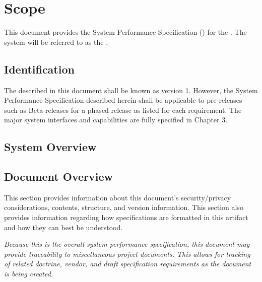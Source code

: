 
\chapter{Scope}
\label{loc:Scope}


This document provides the System Performance Specification (\SPS) for the \ThisSystem. 
The system will be referred to as the \ThisSys.


\section{Identification}
\label{loc:Identification}


The \ThisSystem described in this document shall be known as \ThisSys version 1.
However, the System Performance Specification {\SPS} described herein shall be applicable to pre-releases such as Beta-releases for a phased release as listed for each requirement.
The major system interfaces and capabilities are fully specified in Chapter 3.


\section{System Overview}
\label{loc:SystemOverview}





\newpage
\section{Document Overview}
\label{loc:DocumentOverview}


This section provides information about this document's security/privacy considerations, contents, structure, and version information.
This section also provides information regarding how specifications are formatted in this artifact and how they can best be understood.













{\em 
Because this is the overall system performance specification, this document may provide traceability to miscellaneous project documents.
This allows for tracking of related doctrine, vendor, and draft specification requirements as the document is being created.
}



